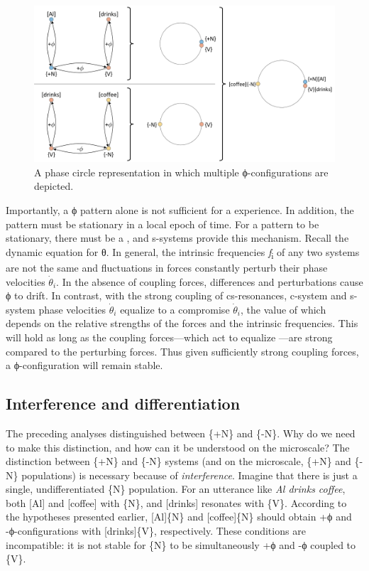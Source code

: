   
\begin{figure}
\includegraphics[width=\textwidth]{figures/Tilsen-img22.png}
\caption{A phase circle representation in which multiple ϕ-configurations are depicted.}
\label{fig:2:15}
\end{figure}
 

  Importantly, a ϕ pattern alone is not sufficient for a  experience. In addition, the pattern must be stationary in a local epoch of time. For a pattern to be stationary, there must be a , and s-systems provide this mechanism. Recall the dynamic equation for θ. In general, the intrinsic frequencies \textit{f}\textsubscript{i} of any two systems are not the same and fluctuations in  forces constantly perturb their phase velocities $\dot{\theta}_i$. In the absence of coupling forces,  differences and  perturbations cause ϕ to drift. In contrast, with the strong coupling of cs-resonances, c-system and s-system phase velocities $\dot{\theta}_i$ equalize to a compromise $\dot{\theta}_i$, the value of which depends on the relative strengths of the forces and the intrinsic frequencies. This will hold as long as the coupling forces—which act to equalize —are strong compared to the perturbing forces. Thus given sufficiently strong coupling forces, a ϕ-configuration will remain stable.

\subsection{Interference and differentiation}

The preceding analyses distinguished between \{+N\} and \{-N\}. Why do we need to make this distinction, and how can it be understood on the microscale? The distinction between \{+N\} and \{-N\} systems (and on the microscale, \{+N\} and \{-N\} populations) is necessary because of \textit{interference}. Imagine that there is just a single, undifferentiated \{N\} population. For an utterance like \textit{Al drinks coffee}, both [Al] and [coffee]  with \{N\}, and [drinks] resonates with \{V\}. According to the  hypotheses presented earlier, [Al]\{N\} and [coffee]\{N\} should obtain +ϕ and -ϕ-configurations with [drinks]\{V\}, respectively. These conditions are incompatible: it is not stable for \{N\} to be simultaneously +ϕ and -ϕ coupled to \{V\}.

